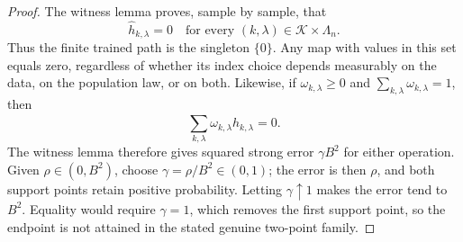 \begin{proof}
The witness lemma proves, sample by sample, that
\[
 \widehat h_{k,\lambda}=0
 \quad\text{for every }(k,\lambda)\in\mathcal K\times\Lambda_n.
\]
Thus the finite trained path is the singleton \(\{0\}\). Any map with values in this set equals zero, regardless of whether its index choice depends measurably on the data, on the population law, or on both. Likewise, if \(\omega_{k,\lambda}\ge0\) and \(\sum_{k,\lambda}\omega_{k,\lambda}=1\), then
\[
 \sum_{k,\lambda}\omega_{k,\lambda}\widehat h_{k,\lambda}=0.
\]
The witness lemma therefore gives squared strong error \(\gamma B^2\) for either operation. Given \(\rho\in(0,B^2)\), choose \(\gamma=\rho/B^2\in(0,1)\); the error is then \(\rho\), and both support points retain positive probability. Letting \(\gamma\uparrow1\) makes the error tend to \(B^2\). Equality would require \(\gamma=1\), which removes the first support point, so the endpoint is not attained in the stated genuine two-point family.
\end{proof}